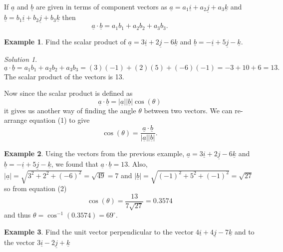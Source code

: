 \documentclass[
  11pt,
  oneside]{book}
\newcommand{\slide}{}
\theoremstyle{definition}
\theoremstyle{definition}
\newtheorem{example}{Example}[chapter]
\theoremstyle{definition}
\theoremstyle{definition}
\theoremstyle{remark}
\newtheorem*{solution}{Solution}
\begin{document}
\slide

If \(\underline a\) and \(\underline b\) are given in terms of component vectors as \(\underline a = a_1\underline i + a_2\underline j + a_3\underline k\) and \(\underline b = b_1\underline i + b_2\underline j + b_3\underline k\) then
\[
\underline a \cdot\underline b = a_1b_1 + a_2b_2 + a_3b_3.
\]
\slide

\begin{example}
Find the scalar product of \(\underline a = 3\underline i + 2\underline j - 6\underline k\) and \(\underline b = -\underline i + 5\underline j - \underline k\).
\end{example}

\begin{solution}
\[
\underline a\cdot\underline b = a_1b_1 + a_2b_2 + a_3b_3 = (3)(-1)+(2)(5)+(-6)(-1) = -3+10+6=13.
\]
The scalar product of the vectors is 13.
\end{solution}

Now since the scalar product is defined as
\[
\underline a \cdot\underline b = |\underline a||\underline b| \cos(\theta)\tag{1}
\]
it gives us another way of finding the angle \(\theta\) between two vectors. We can re-arrange equation (1) to give
\[
\cos(\theta) = \frac{\underline a\cdot\underline b}{|\underline a||\underline b|}.\tag{2}
\]
\slide

\begin{example}
Using the vectors from the previous example, \(\underline a = 3\underline i + 2\underline j - 6\underline k\) and \(\underline b = -\underline i + 5\underline j - \underline k\), we found that \(\underline a\cdot\underline b = 13\).
Also, \(|\underline a| = \sqrt{3^2+2^2+(-6)^2}=\sqrt{49}=7\) and \(|\underline b| = \sqrt{(-1)^2+5^2+(-1)^2} = \sqrt{27}\) so from equation (2)
\[
\cos(\theta) = \frac{13}{7\sqrt{27}} = 0.3574
\]
and thus \(\theta = \cos^{-1}(0.3574) = 69^\circ\).
\end{example}

\slide

\begin{example}
Find the unit vector perpendicular to the vector \(4\underline i+4\underline j-7\underline k\) and to the vector \(3\underline i - 2\underline j+\underline k\)
\end{example}
\end{document}
